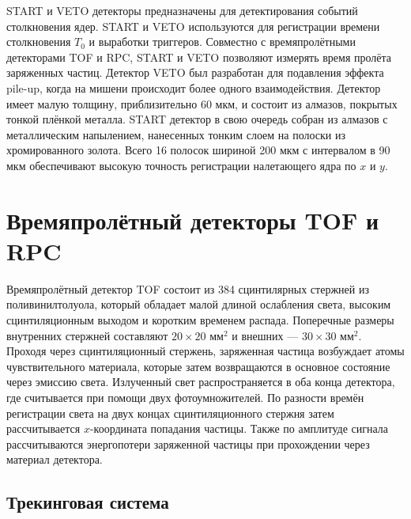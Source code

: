 START и VETO детекторы предназначены для детектирования событий столкновения ядер.
START и VETO используются для регистрации времени столкновения $T_0$ и выработки триггеров.
Совместно с времяпролётными детекторами TOF и RPC, START и VETO позволяют измерять время пролёта заряженных частиц.
Детектор VETO был разработан для подавления эффекта pile-up, когда на мишени происходит более одного взаимодействия.
Детектор имеет малую толщину, приблизительно 60 мкм, и состоит из алмазов, покрытых тонкой плёнкой металла. 
START детектор в свою очередь собран из алмазов с металлическим напылением, нанесенных тонким слоем на полоски из хромированного золота.
Всего 16 полосок шириной 200 мкм с интервалом в 90 мкм обеспечивают высокую точность регистрации налетающего ядра по $x$ и $y$.

\section{Времяпролётный детекторы TOF и RPC}

Времяпролётный детектор TOF состоит из 384 сцинтилярных стержней из поливинилтолуола, который обладает малой длиной ослабления света, высоким сцинтиляционным выходом и коротким временем распада.
Поперечные размеры внутренних стержней составляют $20 \times 20$ мм$^2$ и внешних --- $30\times30$ мм$^2$.
Проходя через сцинтиляционный стержень, заряженная частица возбуждает атомы чувствительного материала, которые затем возвращаются в основное состояние через эмиссию света.
Излученный свет распространяется в оба конца детектора, где считывается при помощи двух фотоумножителей.
По разности времён регистрации света на двух концах сцинтиляционного стержня затем рассчитывается $x$-координата попадания частицы.
Также по амплитуде сигнала рассчитываются энергопотери заряженной частицы при прохождении через материал детектора.

\subsection{ Трекинговая система }

